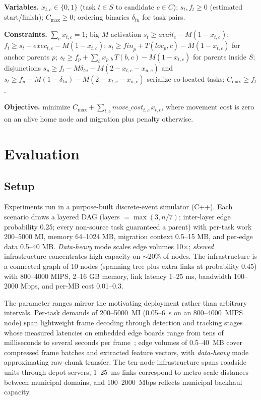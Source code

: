 \documentclass[conference]{IEEEtran}
\theoremstyle{remark}
\begin{document}
\textbf{Variables.} $x_{t,c}\in\{0,1\}$ (task $t\in S$ to candidate
$c\in C$); $s_t, f_t \ge 0$ (estimated start/finish); $C_{\max}\ge0$;
ordering binaries $\delta_{tu}$ for task pairs.

\textbf{Constraints.} $\sum_c x_{t,c}=1$; big-$M$ activation
$s_t \ge \mathit{avail}_c - M(1-x_{t,c})$;
$f_t \ge s_t + \mathit{exec}_{t,c} - M(1-x_{t,c})$;
$s_t \ge \mathit{fin}_p + T(\mathit{loc}_p, c) - M(1-x_{t,c})$ for anchor
parents $p$;
$s_t \ge f_p + \textstyle\sum_b x_{p,b}\,T(b,c) - M(1-x_{t,c})$ for parents
inside $S$;
disjunctions $s_u \ge f_t - M\delta_{tu} - M(2-x_{t,c}-x_{u,c})$ and
$s_t \ge f_u - M(1-\delta_{tu}) - M(2-x_{t,c}-x_{u,c})$ serialize co-located
tasks; $C_{\max} \ge f_t$.

\textbf{Objective.} minimize $C_{\max} + \sum_{t,c}
\mathit{move\_cost}_{t,c}\,x_{t,c}$, where movement cost is zero on an alive
home node and migration plus penalty otherwise.

\section{Evaluation}
\label{sec:eval}

\subsection{Setup}
\label{sec:setup}

Experiments run in a purpose-built discrete-event simulator (C++). Each
scenario draws a layered DAG (layers $=\max(3, n/7)$; inter-layer edge
probability 0.25; every non-source task guaranteed a parent) with per-task
work 200--5000 MI, memory 64--1024 MB, migration context 0.5--15 MB, and
per-edge data 0.5--40 MB. \emph{Data-heavy} mode scales edge volumes
10$\times$; \emph{skewed} infrastructure concentrates high capacity on
$\sim$20\% of nodes. The infrastructure is a connected graph of 10 nodes
(spanning tree plus extra links at probability 0.45) with 800--4000 MIPS,
2--16 GB memory, link latency 1--25 ms, bandwidth 100--2000 Mbps, and
per-MB cost 0.01--0.3.

The parameter ranges mirror the motivating deployment rather than
arbitrary intervals. Per-task demands of 200--5000~MI (0.05--6~s on an
800--4000~MIPS node) span lightweight frame decoding through detection
and tracking stages whose measured latencies on embedded edge boards
range from tens of milliseconds to several seconds per
frame~\cite{edgebench21,edgedetect24}; edge volumes of 0.5--40~MB cover
compressed frame batches and extracted feature vectors, with
\emph{data-heavy} mode approximating raw-chunk transfer. The ten-node
infrastructure spans roadside units through depot servers, 1--25~ms
links correspond to metro-scale distances between municipal domains,
and 100--2000~Mbps reflects municipal backhaul capacity.
\end{document}
